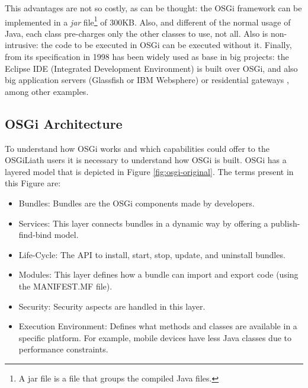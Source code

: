 \documentclass{sig-alternate}
\begin{document}
This advantages are not so
                               costly, as can be thought: the OSGi
                                framework can be implemented in a
                                {\em jar} file\footnote{A jar file is
                                a file that groups the compiled Java
                                files.} of 300KB. Also, and different
                                of the normal usage of Java, each
                                class pre-charges only the other
                                classes to use, not all. Also is
                                non-intrusive: the code to be
                                executed in OSGi can be executed
                                without it. Finally, from its
                                specification in 1998 has been widely
                                used as base in big projects: the
                                Eclipse IDE (Integrated Development
                                Environment) is built over OSGi, and
                                also big application servers
                               (Glassfish or IBM Websphere) or
                               residential gateways
                               \cite{GATEWAY}, among other
                               examples. 

\subsection{OSGi Architecture}
To understand how OSGi \cite{OSGI} works and which capabilities could offer to the OSGiLiath users it is necessary to understand how OSGi is built. OSGi has a layered model that is depicted in Figure \ref{fig:osgi-original}. The terms present in this Figure are:

\begin{itemize}
\item Bundles: Bundles are the OSGi components made by developers.
\item Services: This layer connects bundles in a dynamic way by offering a publish-find-bind model.
\item Life-Cycle: The API to install, start, stop, update, and uninstall bundles.
\item Modules: This layer defines how a bundle can import and export code (using the MANIFEST.MF file).
\item Security: Security aspects are handled in this layer.
\item Execution Environment: Defines what methods and classes are available in a specific platform. For example, mobile devices have less Java classes due to performance constraints.
\end{itemize}
\end{document}
